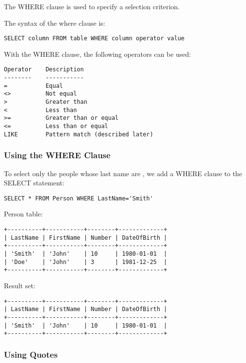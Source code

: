 \documentclass{howto}
\begin{document}
The WHERE clause is used to specify a selection criterion.

The syntax of the where clause is:
\begin{verbatim}
SELECT column FROM table WHERE column operator value
\end{verbatim}

With the WHERE clause, the following operators can be used:

\begin{verbatim}
Operator    Description
--------    -----------
=           Equal
<>          Not equal
>           Greater than
<           Less than
>=          Greater than or equal
<=          Less than or equal
LIKE        Pattern match (described later)
\end{verbatim}


\subsubsection{Using the WHERE Clause}

To select only the people whose last name are , we add a WHERE clause to the SELECT statement:

\begin{verbatim}
SELECT * FROM Person WHERE LastName='Smith'
\end{verbatim}

Person table:
\begin{verbatim}
+----------+-----------+--------+-------------+
| LastName | FirstName | Number | DateOfBirth |
+----------+-----------+--------+-------------+
| 'Smith'  | 'John'    | 10     | 1980-01-01  |
| 'Doe'    | 'John'    | 3      | 1981-12-25  |
+----------+-----------+--------+-------------+
\end{verbatim}

Result set:
\begin{verbatim}
+----------+-----------+--------+-------------+
| LastName | FirstName | Number | DateOfBirth |
+----------+-----------+--------+-------------+
| 'Smith'  | 'John'    | 10     | 1980-01-01  |
+----------+-----------+--------+-------------+
\end{verbatim}

\subsubsection{Using Quotes}
\end{document}
